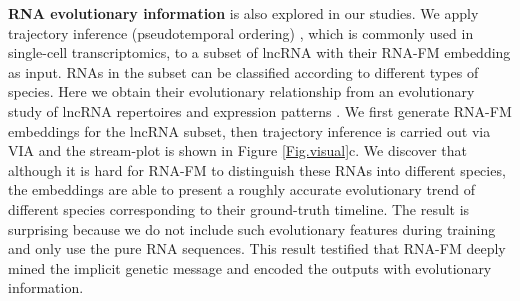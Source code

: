 \textbf{RNA evolutionary information} is also explored in our studies. We apply trajectory inference (pseudotemporal ordering) \cite{saelens2019comparison}, which is commonly used in single-cell transcriptomics, to a subset of lncRNA with their RNA-FM embedding as input. RNAs in the subset can be classified according to different types of species. Here we obtain their evolutionary relationship from an evolutionary study of lncRNA repertoires and expression patterns \cite{necsulea2014evolution}. We first generate RNA-FM embeddings for the lncRNA subset, then trajectory inference is carried out via VIA \cite{stassen2021generalized} and the stream-plot is shown in Figure \ref{Fig.visual}c. We discover that although it is hard for RNA-FM to distinguish these RNAs into different species, the embeddings are able to present a roughly accurate evolutionary trend of different species corresponding to their ground-truth timeline. The result is surprising because we do not include such evolutionary features during training and only use the pure RNA sequences. This result testified that RNA-FM deeply mined the implicit genetic message and encoded the outputs with evolutionary information.







